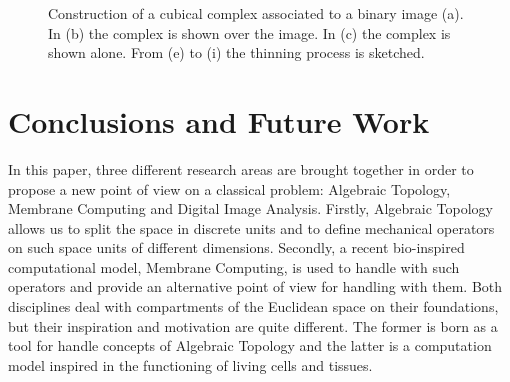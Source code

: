 \documentclass[journal]{IEEEtran}
\begin{document}
\begin{figure}
\caption{Construction of a cubical complex associated to a binary image (a). In (b) the complex is shown over the image. In (c) the complex is shown alone. From (e) to (i) the thinning process is sketched.}
\end{figure}
\section{Conclusions and Future Work}
In this paper, three different research areas are brought together
in order to propose a new point of view on a classical problem:
Algebraic Topology, Membrane Computing and Digital Image Analysis.
Firstly, Algebraic Topology allows us to split the space in discrete
units and to define mechanical operators on such space units of
different dimensions. Secondly, a recent bio-inspired computational
model, Membrane Computing, is used to handle with such operators and
provide an alternative point of view for handling with them. Both
disciplines deal with compartments of the Euclidean space on their
foundations, but their inspiration and motivation are quite
different. The former is born as a tool for handle concepts of
Algebraic Topology and the latter is a computation model inspired in
the functioning of living cells and tissues.
\end{document}
